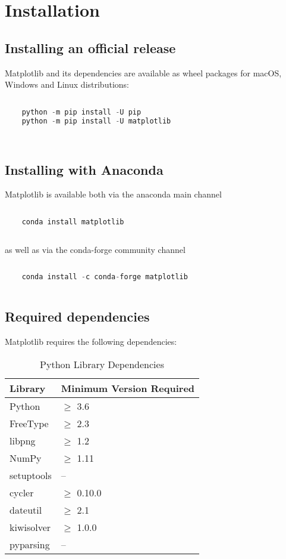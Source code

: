 \section{Installation}

\subsection{Installing an official release}

Matplotlib and its dependencies are available as wheel packages for macOS, Windows and Linux distributions:

\begin{lstlisting}[language=Python]
	
	python -m pip install -U pip
	python -m pip install -U matplotlib
	
	
\end{lstlisting}


\subsection{Installing with Anaconda}

Matplotlib is available both via the anaconda main channel

\begin{lstlisting}[language=Python]
	
	conda install matplotlib
		
\end{lstlisting}

as well as via the conda-forge community channel

\begin{lstlisting}[language=Python]
	
	conda install -c conda-forge matplotlib
	
\end{lstlisting}

\subsection{Required dependencies}

Matplotlib requires the following dependencies:

\begin{table}[htbp]
	\centering
	\caption{Python Library Dependencies}
	\label{tab:dependencies}
	\begin{tabular}{|l|l|}
		\hline
		\textbf{Library} & \textbf{Minimum Version Required} \\
		\hline
		Python & $\geq$ 3.6 \\
		FreeType & $\geq$ 2.3 \\
		libpng & $\geq$ 1.2 \\
		NumPy & $\geq$ 1.11 \\
		setuptools & -- \\
		cycler & $\geq$ 0.10.0 \\
		dateutil & $\geq$ 2.1 \\
		kiwisolver & $\geq$ 1.0.0 \\
		pyparsing & -- \\
		\hline
	\end{tabular}
\end{table}


